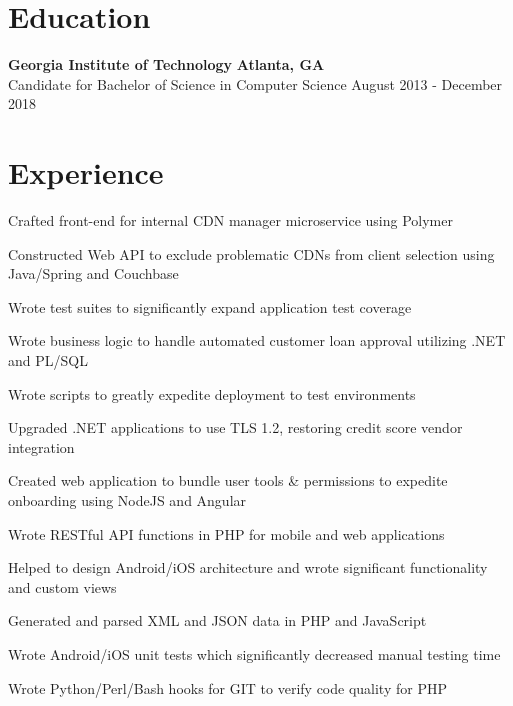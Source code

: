 \documentclass[line]{resume}
\begin{document}
\begin{center}
\end{center}
\section{Education}
\textbf{Georgia Institute of Technology} \hfill \textbf{Atlanta, GA} \\
Candidate for Bachelor of Science in Computer Science  \hfill August 2013 - December 2018
\section{Experience}
\begin{myitemize}
	\item Crafted front-end for internal CDN manager microservice using Polymer
	\item Constructed Web API to exclude problematic CDNs from client selection using Java/Spring and Couchbase
	\item Wrote test suites to significantly expand application test coverage
\end{myitemize}

\begin{myitemize}
	\item Wrote business logic to handle automated customer loan approval utilizing .NET and PL/SQL
	\item Wrote scripts to greatly expedite deployment to test environments
	\item Upgraded .NET applications to use TLS 1.2, restoring credit score vendor integration
	\item Created web application to bundle user tools \& permissions to expedite onboarding using NodeJS and Angular
\end{myitemize}

\begin{myitemize}
	\item Wrote RESTful API functions in PHP for mobile and web applications
	\item Helped to design Android/iOS architecture and wrote significant functionality and custom views
	\item Generated and parsed XML and JSON data in PHP and JavaScript 
	\item Wrote Android/iOS unit tests which significantly decreased manual testing time 
	\item Wrote Python/Perl/Bash hooks for GIT to verify code quality for PHP
\end{myitemize}
\end{document}
